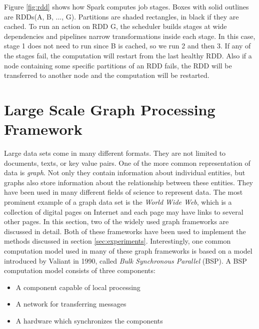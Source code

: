 \documentclass[english]{tktltiki}
\begin{document}
Figure \ref{fig:rdd} shows how Spark computes job stages. Boxes with solid outlines are RDDs(A, B, ..., G). Partitions are shaded rectangles, in black if they are cached. To run an action on RDD G, the scheduler builds stages at wide dependencies and pipelines narrow transformations inside each stage. In this case, stage 1 does not need to run since B is cached, so we run 2 and then 3. If any of the stages fail, the computation will restart from the last healthy RDD. Also if a node containing some specific partitions of an RDD fails, the RDD will be transferred to another node and the computation will be restarted. 

\newpage

\section{Large Scale Graph Processing Framework}
\label{sec:biggraph}
Large data sets come in many different formats. They are not limited to documents, texts, or key value pairs. One of the more common representation of data is \textit{graph}. Not only they contain information about individual entities, but graphs also store information about the relationship between these entities. They have been used in many different fields of science to represent data. The most prominent example of a graph data set is the \textit{World Wide Web}, which is a collection of digital pages on Internet and each page may have links to several other pages. In this section, two of the widely used graph frameworks are discussed in detail. Both of these frameworks have been used to implement the methods discussed in section \ref{sec:experiments}. Interestingly, one common computation model used in many of these graph frameworks is based on a model introduced by Valiant \cite{valiant90} in 1990, called \textit{Bulk Synchronous Parallel} (BSP). A BSP computation model consists of three components: 
\begin{itemize}
\item
A component capable of local processing
\item
A network for transferring messages
\item
A hardware which synchronizes the components
\end{itemize}
\end{document}
